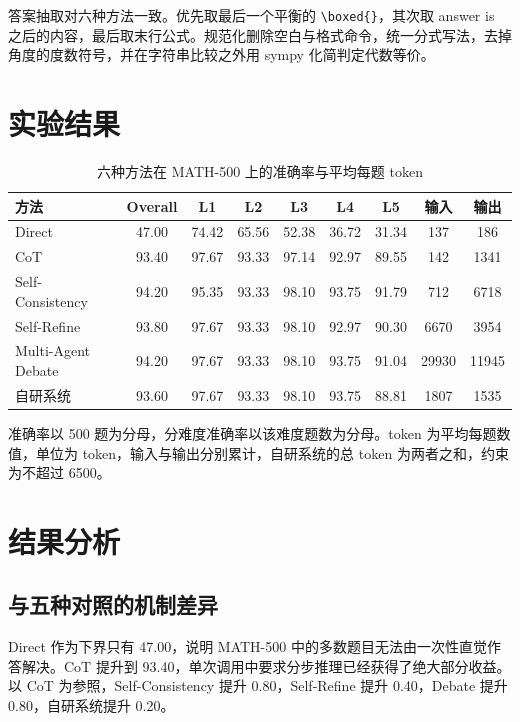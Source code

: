 \documentclass[12pt]{ctexart}
\begin{document}
答案抽取对六种方法一致。优先取最后一个平衡的 \verb|\boxed{}|，其次取 answer is 之后的内容，最后取末行公式。规范化删除空白与格式命令，统一分式写法，去掉角度的度数符号，并在字符串比较之外用 sympy 化简判定代数等价。

\section{实验结果}

\begin{table}[H]
  \centering
  \caption{六种方法在 MATH-500 上的准确率与平均每题 token}
  \begin{tabular}{lcccccccc}
    \toprule
    方法 & Overall & L1 & L2 & L3 & L4 & L5 & 输入 & 输出 \\
    \midrule
    Direct & 47.00 & 74.42 & 65.56 & 52.38 & 36.72 & 31.34 & 137 & 186 \\
    CoT & 93.40 & 97.67 & 93.33 & 97.14 & 92.97 & 89.55 & 142 & 1341 \\
    Self-Consistency & 94.20 & 95.35 & 93.33 & 98.10 & 93.75 & 91.79 & 712 & 6718 \\
    Self-Refine & 93.80 & 97.67 & 93.33 & 98.10 & 92.97 & 90.30 & 6670 & 3954 \\
    Multi-Agent Debate & 94.20 & 97.67 & 93.33 & 98.10 & 93.75 & 91.04 & 29930 & 11945 \\
    自研系统 & 93.60 & 97.67 & 93.33 & 98.10 & 93.75 & 88.81 & 1807 & 1535 \\
    \bottomrule
  \end{tabular}

  \smallskip
  \footnotesize 准确率以 500 题为分母，分难度准确率以该难度题数为分母。token 为平均每题数值，单位为 token，输入与输出分别累计，自研系统的总 token 为两者之和，约束为不超过 6500。
\end{table}

\section{结果分析}

\subsection{与五种对照的机制差异}

Direct 作为下界只有 47.00，说明 MATH-500 中的多数题目无法由一次性直觉作答解决。CoT 提升到 93.40，单次调用中要求分步推理已经获得了绝大部分收益。以 CoT 为参照，Self-Consistency 提升 0.80，Self-Refine 提升 0.40，Debate 提升 0.80，自研系统提升 0.20。
\end{document}
